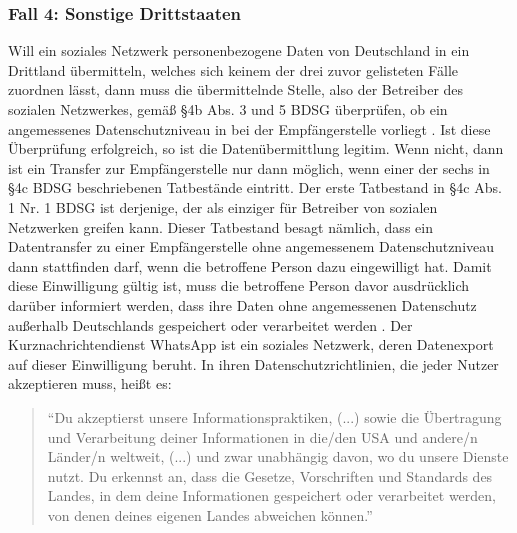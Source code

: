 \subsubsection{Fall 4: Sonstige Drittstaaten}
Will ein soziales Netzwerk personenbezogene Daten von Deutschland in ein Drittland übermitteln, welches sich keinem der drei zuvor gelisteten Fälle zuordnen lässt, dann muss die übermittelnde Stelle, also der Betreiber des sozialen Netzwerkes, gemäß §4b Abs. 3 und 5 BDSG überprüfen, ob ein angemessenes Datenschutzniveau in bei der Empfängerstelle vorliegt \autocite[vgl.][]{LDI.2017}. Ist diese Überprüfung erfolgreich, so ist die Datenübermittlung legitim. Wenn nicht, dann ist ein Transfer zur Empfängerstelle nur dann möglich, wenn einer der sechs in §4c BDSG beschriebenen Tatbestände eintritt. Der erste Tatbestand in §4c Abs. 1 Nr. 1 BDSG ist derjenige, der als einziger für Betreiber von sozialen Netzwerken greifen kann. Dieser Tatbestand besagt nämlich, dass ein Datentransfer zu einer Empfängerstelle ohne angemessenem Datenschutzniveau dann stattfinden darf, wenn die betroffene Person dazu eingewilligt hat. Damit diese Einwilligung gültig ist, muss die betroffene Person davor ausdrücklich darüber informiert werden, dass ihre Daten ohne angemessenen Datenschutz außerhalb Deutschlands gespeichert oder verarbeitet werden \autocite[vgl.][]{LDI.2017}. Der Kurznachrichtendienst WhatsApp ist ein soziales Netzwerk, deren Datenexport auf dieser Einwilligung beruht. In ihren Datenschutzrichtlinien, die jeder Nutzer akzeptieren muss, heißt es: 
\begin{quotation}
	"`Du akzeptierst unsere Informationspraktiken, (...) sowie die Übertragung und Verarbeitung deiner Informationen in die/den USA und andere/n Länder/n weltweit, (...) und zwar unabhängig davon, wo du unsere Dienste nutzt. Du erkennst an, dass die Gesetze, Vorschriften und Standards des Landes, in dem deine Informationen gespeichert oder verarbeitet werden, von denen deines eigenen Landes abweichen können."'\textsuperscript{ }\autocite[][]{WhatsAppInc..2017}
\end{quotation}

